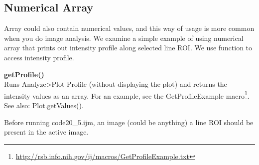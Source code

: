 \subsection{Numerical Array}
\label{subsec:numericalarray}
Array could also contain numerical values, and this way of usage is more common when you do image analysis. We examine a simple example of using numerical array that prints out intensity profile along selected line ROI. We use function to access intensity profile. 

\begin{shaded}\begin{indentCom}
\textbf{getProfile()}\\
Runs Analyze>Plot Profile (without displaying the plot) and returns the intensity values as an array. For an example, see the GetProfileExample macro\footnote{\url{http://rsb.info.nih.gov/ij/macros/GetProfileExample.txt}}. See also: Plot.getValues().
\end{indentCom}\end{shaded}

Before running code20\_5.ijm, an image (could be anything) a line ROI should be present in the active image.



